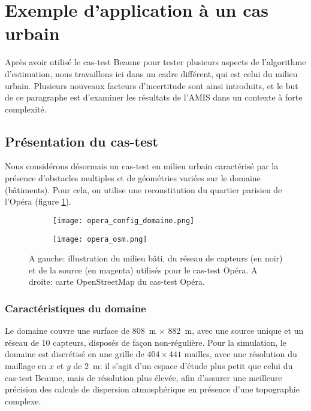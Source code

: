 \section{Exemple d'application à un cas urbain}

Après avoir utilisé le cas-test Beaune pour tester plusieurs aspects de l'algorithme d'estimation, nous travaillons ici dans un cadre différent, qui est celui du milieu urbain. Plusieurs nouveaux facteurs d'incertitude sont ainsi introduits, et le but de ce paragraphe est d'examiner les résultats de l'AMIS dans un contexte à forte complexité.\\

\subsection{Présentation du cas-test}

Nous considérons désormais un cas-test en milieu urbain caractérisé par la présence d'obstacles multiples et de géométries variées sur le domaine (bâtiments). Pour cela, on utilise une reconstitution du quartier parisien de l'Opéra (figure \ref{fig_opera_config}).\\



\begin{figure}[h!]
	\centering
	\begin{subfigure}[t]{0.5\textwidth}
		\centering
		\texttt{[image: opera\_config\_domaine.png]}
		\caption{}
		\label{fig_opera_config}
	\end{subfigure}%
	\begin{subfigure}[t]{0.5\textwidth}
		\centering
		\texttt{[image: opera\_osm.png]}
		\caption{}
		\label{fig_opera_carte}
	\end{subfigure}
	\caption{A gauche: illustration du milieu bâti, du réseau de capteurs (en noir) et de la source (en magenta) utilisés pour le cas-test Opéra. A droite: carte OpenStreetMap du cas-test Opéra.}
	\label{fig_opera_presentation}
\end{figure}

\subsubsection{Caractéristiques du domaine}
Le domaine couvre une surface de \SI{808}{\meter} $\times$ \SI{882}{\meter}, avec une source unique et un réseau de 10 capteurs, disposés de façon non-régulière. Pour la simulation, le domaine est discrétisé en une grille de $404 \times 441$ mailles, avec une résolution du maillage en $x$ et $y$ de \SI{2}{\meter}: il s'agit d'un espace d'étude plus petit que celui du cas-test Beaune, mais de résolution plus élevée, afin d'assurer une meilleure précision des calculs de dispersion atmosphérique en présence d'une topographie complexe. \\


